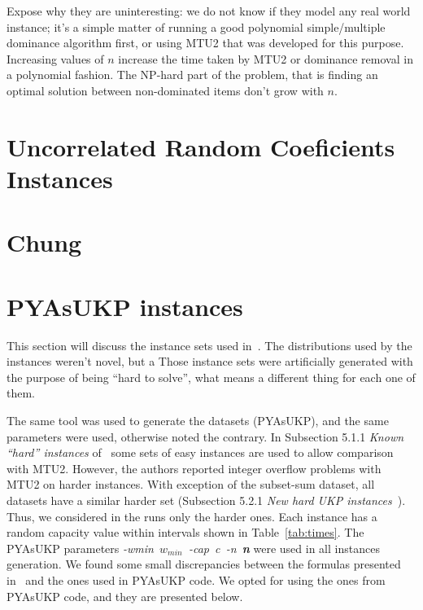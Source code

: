 Expose why they are uninteresting: we do not know if they model any real world instance; it's a simple matter of running a good polynomial simple/multiple dominance algorithm first, or using MTU2 that was developed for this purpose. Increasing values of \(n\) increase the time taken by MTU2 or dominance removal in a polynomial fashion. The NP-hard part of the problem, that is finding an optimal solution between non-dominated items don't grow with \(n\). %


\section{Uncorrelated Random Coeficients Instances}

\section{Chung}

\section{PYAsUKP instances}

This section will discuss the instance sets used in~\cite{pya}.
The distributions used by the instances weren't novel, but a 
Those instance sets were artificially generated with the purpose of being ``hard to solve'', what means a different thing for each one of them.


The same tool was used to generate the datasets (PYAsUKP), and the same parameters were used, otherwise noted the contrary. 
In Subsection 5.1.1 \emph{Known ``hard'' instances} of~\cite{pya} some sets of easy instances are used to allow comparison with MTU2. 
However, the authors reported integer overflow problems with MTU2 on harder instances. 
With exception of the subset-sum dataset, all datasets have a similar harder set (Subsection 5.2.1 \emph{New hard UKP instances}~\cite{pya}).
Thus, we considered in the runs only the harder ones. 
Each instance has a random capacity value within intervals shown in Table~\ref{tab:times}. 
The PYAsUKP parameters \mbox{\emph{-wmin \(w_{min}\) -cap c -n \textbf{n}}} were used in all instances generation. 
We found some small discrepancies between the formulas presented in~\cite{pya} and the ones used in PYAsUKP code.
We opted for using the ones from  PYAsUKP code, and they are presented below.

